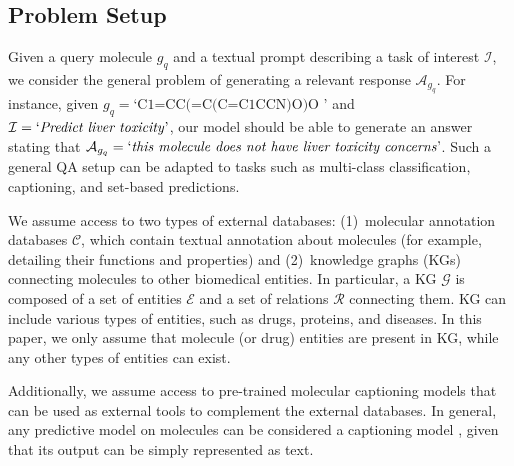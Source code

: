 

\subsection{Problem Setup}

Given a query molecule $g_q$ and a textual prompt describing a task of interest $\mathcal{I}$, we consider the general problem of generating a relevant response  $\mathcal{A}_{g_q}$. For instance, given $g_q=\text{`C1=CC(=C(C=C1CCN)O)O
'}$ and $\mathcal{I}=\text{`\emph{Predict liver toxicity}'}$, our model should be able to generate an answer stating that $\mathcal{A}_{g_q}=\text{`\emph{this molecule does not have liver toxicity concerns}'}$. Such a general QA setup can be adapted to tasks such as multi-class classification, captioning, and set-based predictions. 
 
We assume access to two types of external databases: (1)~molecular annotation databases $\mathcal{C}$, which contain textual annotation about molecules (for example, detailing their functions and properties) and (2)~knowledge graphs (KGs) connecting molecules to other biomedical entities.
In particular, a KG $\mathcal{G}$ is composed of a set of entities $\mathcal{E}$ and a set of relations $\mathcal{R}$ connecting them. 
KG can include various types of entities, such as drugs, proteins, and diseases. 
In this paper, we only assume that molecule (or drug) entities are present in KG, while any other types of entities can exist.

Additionally, we assume access to pre-trained molecular captioning models that can be used as external tools to complement the external databases. In general, any predictive model on molecules can be considered a captioning model \cite{edwards2022translation,pei2023biot5}, given that its output can be simply represented as text. 



